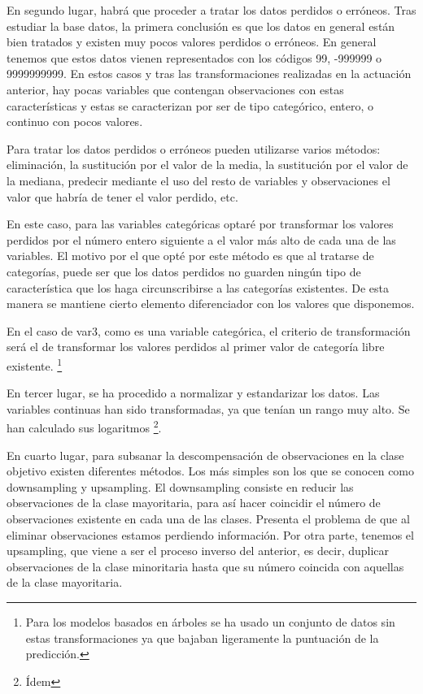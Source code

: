 \documentclass[11pt,a4paper,spanish]{article} %
\begin{document}
En segundo lugar, habrá que proceder a tratar los datos perdidos o erróneos. Tras estudiar la base datos, la primera conclusión es que los datos en general están bien tratados y existen muy pocos valores perdidos o erróneos. En general tenemos que estos datos vienen representados con los códigos 99, -999999 o 9999999999. En estos casos y tras las transformaciones realizadas en la actuación anterior, hay pocas variables que contengan observaciones con estas características y estas se caracterizan por ser de tipo categórico, entero, o continuo con pocos valores. 

Para tratar los datos perdidos o erróneos pueden utilizarse varios métodos: eliminación, la sustitución por el valor de la media, la sustitución por el valor de la mediana, predecir mediante el uso del resto de variables y observaciones el valor que habría de tener el valor perdido, etc. 

En este caso, para las variables categóricas optaré por transformar los valores perdidos por el número entero siguiente a el valor más alto de cada una de las variables. El motivo por el que opté por este método es que al tratarse de categorías, puede ser que los datos perdidos no guarden ningún tipo de característica que los haga circunscribirse a las categorías existentes. De esta manera se mantiene cierto elemento diferenciador con los valores que disponemos. 

En el caso de var3, como es una variable categórica, el criterio de transformación será el de transformar los valores perdidos al primer valor de categoría libre existente. \footnote{Para los modelos basados en árboles se ha usado un conjunto de datos sin estas transformaciones ya que bajaban ligeramente la puntuación de la predicción.}

En tercer lugar, se ha procedido a normalizar y estandarizar los datos. Las variables continuas han sido transformadas, ya que tenían un rango muy alto. Se han calculado sus logaritmos \footnote{Ídem}.

En cuarto lugar, para subsanar la descompensación de observaciones en la clase objetivo existen diferentes métodos. Los más simples son los que se conocen como downsampling y upsampling. El downsampling consiste en reducir las observaciones de la clase mayoritaria, para así hacer coincidir el número de observaciones existente en cada una de las clases. Presenta el problema de que al eliminar observaciones estamos perdiendo información. 
Por otra parte, tenemos el upsampling, que viene a ser el proceso inverso del anterior, es decir, duplicar observaciones de la clase minoritaria hasta que su número coincida con aquellas de la clase mayoritaria. 
\end{document}
